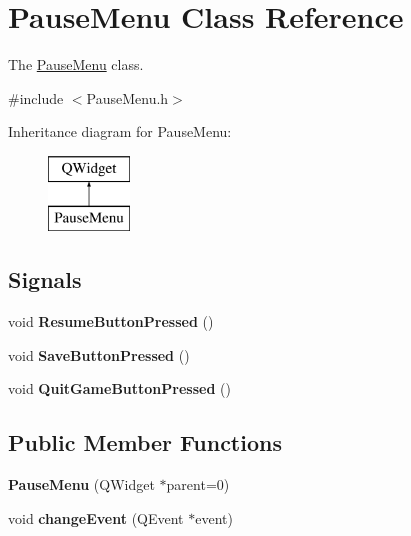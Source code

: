 \hypertarget{classPauseMenu}{\section{Pause\-Menu Class Reference}
\label{classPauseMenu}
}


The \hyperlink{classPauseMenu}{Pause\-Menu} class.  




{\ttfamily \#include $<$Pause\-Menu.\-h$>$}

Inheritance diagram for Pause\-Menu\-:\begin{figure}[H]
\begin{center}
\leavevmode
\includegraphics[height=2.000000cm]{classPauseMenu}
\end{center}
\end{figure}
\subsection*{Signals}
\begin{DoxyCompactItemize}
\item 
\hypertarget{classPauseMenu_ac24806b40fa10843a42f3d3ba96e3e6c}{void {\bfseries Resume\-Button\-Pressed} ()}\label{classPauseMenu_ac24806b40fa10843a42f3d3ba96e3e6c}

\item 
\hypertarget{classPauseMenu_a1525fb2d41bade59de33cad48d23b9d8}{void {\bfseries Save\-Button\-Pressed} ()}\label{classPauseMenu_a1525fb2d41bade59de33cad48d23b9d8}

\item 
\hypertarget{classPauseMenu_af1e7daf3f16ddca8633d9ee393f33dbb}{void {\bfseries Quit\-Game\-Button\-Pressed} ()}\label{classPauseMenu_af1e7daf3f16ddca8633d9ee393f33dbb}

\end{DoxyCompactItemize}
\subsection*{Public Member Functions}
\begin{DoxyCompactItemize}
\item 
\hypertarget{classPauseMenu_a7e37f17609a107981090585aad89a1ec}{{\bfseries Pause\-Menu} (Q\-Widget $\ast$parent=0)}\label{classPauseMenu_a7e37f17609a107981090585aad89a1ec}

\item 
\hypertarget{classPauseMenu_a7ae2f7ecbb859e6370d474db4d086892}{void {\bfseries change\-Event} (Q\-Event $\ast$event)}\label{classPauseMenu_a7ae2f7ecbb859e6370d474db4d086892}

\end{DoxyCompactItemize}


